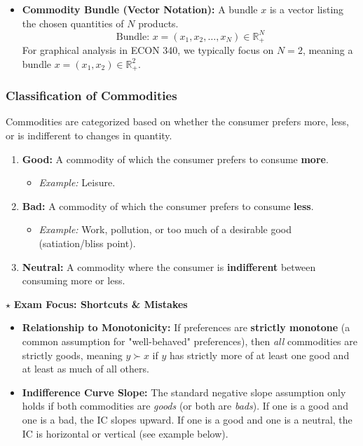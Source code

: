 \documentclass{article}
\begin{document}
\begin{itemize}
    \item \textbf{Commodity Bundle (Vector Notation):} A bundle $x$ is a vector listing the chosen quantities of $N$ products.
    $$\text{Bundle: } x = (x_1, x_2, \dots, x_N) \in \mathbb{R}^N_+$$
    For graphical analysis in ECON 340, we typically focus on $N=2$, meaning a bundle $x=(x_1, x_2) \in \mathbb{R}^2_+$.
\end{itemize}

\subsubsection*{Classification of Commodities}

Commodities are categorized based on whether the consumer prefers more, less, or is indifferent to changes in quantity.

\begin{enumerate}
    \item \textbf{Good:} A commodity of which the consumer prefers to consume \textbf{more}.
    \begin{itemize}
        \item[\circ] \textit{Example:} Leisure.
    \end{itemize}
    \item \textbf{Bad:} A commodity of which the consumer prefers to consume \textbf{less}.
    \begin{itemize}
        \item[\circ] \textit{Example:} Work, pollution, or too much of a desirable good (satiation/bliss point).
    \end{itemize}
    \item \textbf{Neutral:} A commodity where the consumer is \textbf{indifferent} between consuming more or less.
\end{enumerate}

\noindent $\star$ \textbf{Exam Focus: Shortcuts \& Mistakes}

\begin{itemize}
    \item \textbf{Relationship to Monotonicity:} If preferences are \textbf{strictly monotone} (a common assumption for "well-behaved" preferences), then \textit{all} commodities are strictly goods, meaning $y \succ x$ if $y$ has strictly more of at least one good and at least as much of all others.
    \item \textbf{Indifference Curve Slope:} The standard negative slope assumption only holds if both commodities are \textit{goods} (or both are \textit{bads}). If one is a good and one is a bad, the IC slopes upward. If one is a good and one is a neutral, the IC is horizontal or vertical (see example below).
\end{itemize}
\end{document}
